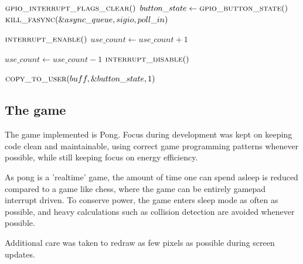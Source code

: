 \begin{algorithmic}
  \footnotesize
    \State $\Call{gpio\_interrupt\_flags\_clear}{\null}$
    \State $button\_state \gets \Call{gpio\_button\_state}{\null}$
      \State $\Call{kill\_fasync}{\&async\_queue, sigio, poll\_in}$
    \EndIf
  \EndFunction
\end{algorithmic}

\begin{algorithmic}
  \footnotesize
      \State $\Call{interrupt\_enable}{\null}$
    \EndIf
    \State $use\_count \gets use\_count + 1$
  \EndFunction
\end{algorithmic}

\begin{algorithmic}
  \footnotesize
    \State $use\_count \gets use\_count - 1$
      \State $\Call{interrupt\_disable}{\null}$
    \EndIf
  \EndFunction
\end{algorithmic}

\begin{algorithmic}
  \footnotesize
    \State $\Call{copy\_to\_user}{buff, \&button\_state, 1}$
  \EndFunction
\end{algorithmic}

\subsection{The game}

The game implemented is Pong. Focus during development was kept on keeping code
clean and maintainable, using correct game programming patterns whenever
possible, while still keeping focus on energy efficiency.

As pong is a 'realtime' game, the amount of time one can spend asleep is
reduced compared to a game like chess, where the game can be entirely gamepad
interrupt driven.  To conserve power, the game enters sleep mode as often as
possible, and heavy calculations such as collision detection are avoided
whenever possible.

Additional care was taken to redraw as few pixels as possible during screen
updates.

